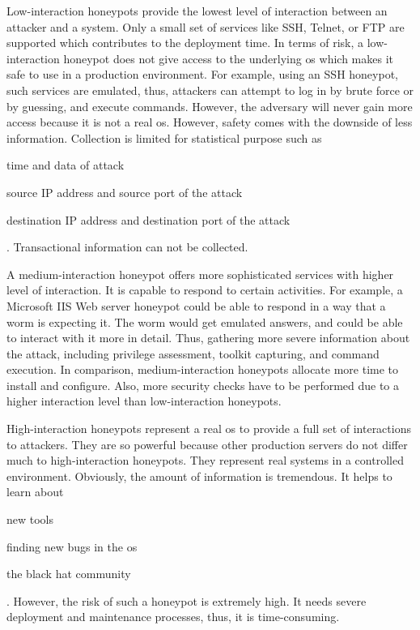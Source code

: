 Low-interaction honeypots provide the lowest level of interaction between an attacker and a system.
Only a small set of services like SSH, Telnet, or FTP are supported which contributes to the deployment time.
In terms of risk, a low-interaction honeypot does not give access to the underlying \ac{os} which makes it safe to use in a production environment.
For example, using an SSH honeypot, such services are emulated, thus, attackers can attempt to log in by brute force or by guessing, and execute commands.
However, the adversary will never gain more access because it is not a real \ac{os}.
However, safety comes with the downside of less information.
Collection is limited for statistical purpose such as
\begin{enumerate*}[label=(\roman*)]
    \item time and data of attack
    \item source IP address and source port of the attack
    \item destination IP address and destination port of the attack
\end{enumerate*}.
Transactional information can not be collected. \cite{Spitzner2003}

A medium-interaction honeypot offers more sophisticated services with higher level of interaction.
It is capable to respond to certain activities.
For example, a Microsoft IIS Web server honeypot could be able to respond in a way that a worm is expecting it.
The worm would get emulated answers, and could be able to interact with it more in detail.
Thus, gathering more severe information about the attack, including privilege assessment, toolkit capturing, and command execution.
In comparison, medium-interaction honeypots allocate more time to install and configure.
Also, more security checks have to be performed due to a higher interaction level than low-interaction honeypots. \cite{Spitzner2003}

High-interaction honeypots represent a real \ac{os} to provide a full set of interactions to attackers.
They are so powerful because other production servers do not differ much to high-interaction honeypots.
They represent real systems in a controlled environment.
Obviously, the amount of information is tremendous. It helps to learn about
\begin{enumerate*}[label=(\roman*)]
    \item new tools
    \item finding new bugs in the \ac{os}
    \item the black hat community
\end{enumerate*}. However, the risk of such a honeypot is extremely high.
It needs severe deployment and maintenance processes, thus, it is time-consuming.

